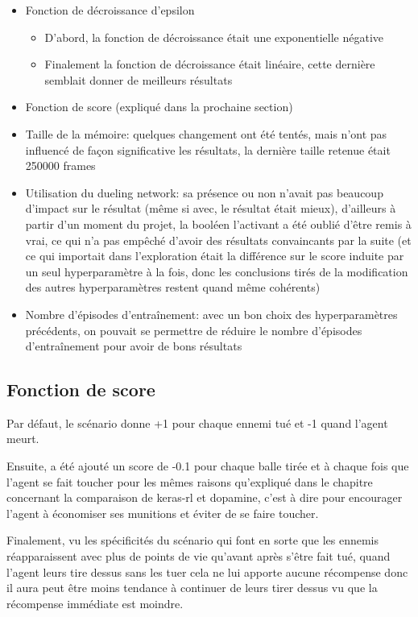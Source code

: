 \documentclass[a4paper,10pt,openany,oneside]{report}
\begin{document}
\begin{itemize}
\begin{itemize}
\end{itemize}
\item Fonction de décroissance d'epsilon
\begin{itemize}
	\item D'abord, la fonction de décroissance était une exponentielle négative
	\item Finalement la fonction de décroissance était linéaire, cette dernière semblait donner de meilleurs résultats
\end{itemize}
\item Fonction de score (expliqué dans la prochaine section)
\item Taille de la mémoire: quelques changement ont été tentés, mais n'ont pas influencé de façon significative les résultats, la dernière taille retenue était 250000 frames 
\item Utilisation du dueling network: sa présence ou non n'avait pas beaucoup d'impact sur le résultat (même si avec, le résultat était mieux), d'ailleurs à partir d'un moment du projet, la booléen l'activant a été oublié d'être remis à vrai, ce qui n'a pas empêché d'avoir des résultats convaincants par la suite (et ce qui importait dans l'exploration était la différence sur le score induite par un seul hyperparamètre à la fois, donc les conclusions tirés de la modification des autres hyperparamètres restent quand même cohérents)
\item Nombre d'épisodes d'entraînement: avec un bon choix des hyperparamètres précédents, on pouvait se permettre de réduire le nombre d'épisodes d'entraînement pour avoir de bons résultats
\end{itemize}
\subsection{Fonction de score}
Par défaut, le scénario donne +1 pour chaque ennemi tué et -1 quand l'agent meurt.

Ensuite, a été ajouté un score de -0.1 pour chaque balle tirée et à chaque fois que l'agent se fait toucher pour les mêmes raisons qu'expliqué dans le chapitre concernant la comparaison de keras-rl et dopamine, c'est à dire pour encourager l'agent à économiser ses munitions et éviter de se faire toucher.

Finalement, vu les spécificités du scénario qui font en sorte que les ennemis réapparaissent avec plus de points de vie qu'avant après s'être fait tué, quand l'agent leurs tire dessus sans les tuer cela ne lui apporte aucune récompense donc il aura peut être moins tendance à continuer de leurs tirer dessus vu que la récompense immédiate est moindre.
\end{document}
